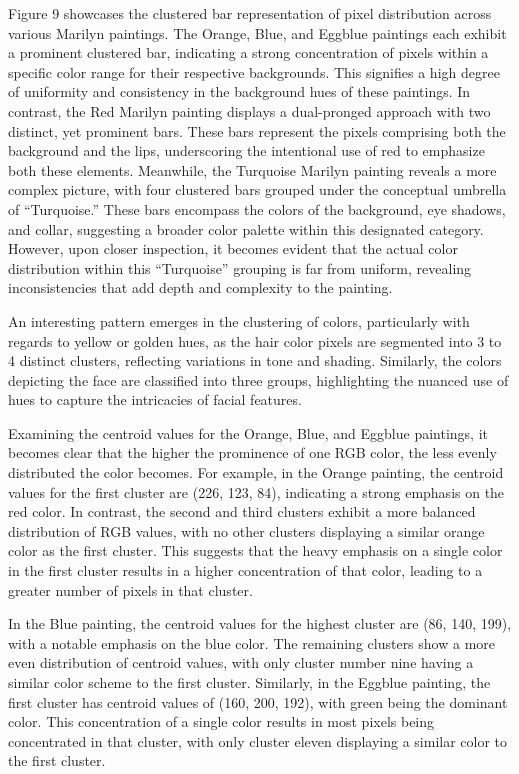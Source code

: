 \documentclass{article}
\begin{document}
Figure 9 showcases the clustered bar representation of pixel
distribution across various Marilyn paintings. The Orange, Blue, and
Eggblue paintings each exhibit a prominent clustered bar, indicating a
strong concentration of pixels within a specific color range for their
respective backgrounds. This signifies a high degree of uniformity and
consistency in the background hues of these paintings. In contrast, the
Red Marilyn painting displays a dual-pronged approach with two distinct,
yet prominent bars. These bars represent the pixels comprising both the
background and the lips, underscoring the intentional use of red to
emphasize both these elements. Meanwhile, the Turquoise Marilyn painting
reveals a more complex picture, with four clustered bars grouped under
the conceptual umbrella of ``Turquoise.'' These bars encompass the
colors of the background, eye shadows, and collar, suggesting a broader
color palette within this designated category. However, upon closer
inspection, it becomes evident that the actual color distribution within
this ``Turquoise'' grouping is far from uniform, revealing
inconsistencies that add depth and complexity to the painting.

An interesting pattern emerges in the clustering of colors, particularly
with regards to yellow or golden hues, as the hair color pixels are
segmented into 3 to 4 distinct clusters, reflecting variations in tone
and shading. Similarly, the colors depicting the face are classified
into three groups, highlighting the nuanced use of hues to capture the
intricacies of facial features.

Examining the centroid values for the Orange, Blue, and Eggblue
paintings, it becomes clear that the higher the prominence of one RGB
color, the less evenly distributed the color becomes. For example, in
the Orange painting, the centroid values for the first cluster are (226,
123, 84), indicating a strong emphasis on the red color. In contrast,
the second and third clusters exhibit a more balanced distribution of
RGB values, with no other clusters displaying a similar orange color as
the first cluster. This suggests that the heavy emphasis on a single
color in the first cluster results in a higher concentration of that
color, leading to a greater number of pixels in that cluster.

In the Blue painting, the centroid values for the highest cluster are
(86, 140, 199), with a notable emphasis on the blue color. The remaining
clusters show a more even distribution of centroid values, with only
cluster number nine having a similar color scheme to the first cluster.
Similarly, in the Eggblue painting, the first cluster has centroid
values of (160, 200, 192), with green being the dominant color. This
concentration of a single color results in most pixels being
concentrated in that cluster, with only cluster eleven displaying a
similar color to the first cluster.
\end{document}

